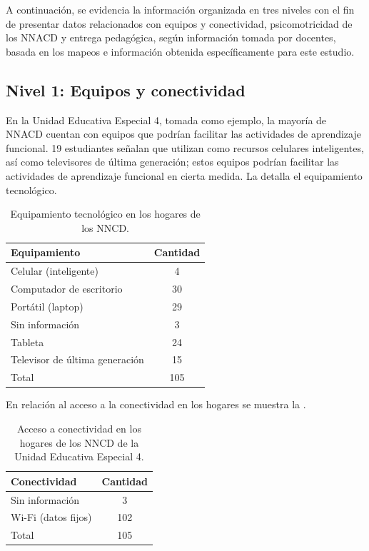 \documentclass[spanish]{textolivre}
\begin{document}
A continuación, se evidencia la información organizada en tres niveles con el fin de presentar datos relacionados con equipos y conectividad, psicomotricidad de los NNACD y entrega pedagógica, según información tomada por docentes, basada en los mapeos e información obtenida específicamente para este estudio.

\subsection{Nivel 1: Equipos y conectividad}\label{sec-fmt-manuscrito}
En la Unidad Educativa Especial 4, tomada como ejemplo, la mayoría de NNACD cuentan con equipos que podrían facilitar las actividades de aprendizaje funcional. 19 estudiantes señalan que utilizan como recursos celulares inteligentes, así como televisores de última generación; estos equipos podrían facilitar las actividades de aprendizaje funcional en cierta medida. La  detalla el equipamiento tecnológico.

\begin{table}[h!]
\centering
\begin{threeparttable}
\caption{Equipamiento tecnológico en los hogares de los NNCD.}
\label{tab02}
\centering
\begin{tabular}{l S}
\toprule
Equipamiento & {Cantidad} \\
\midrule
Celular (inteligente) & 4   \\
Computador de escritorio & 30  \\
Portátil (laptop) & 29 \\
Sin información & 3 \\
Tableta & 24 \\
Televisor de última generación & 15 \\
Total & 105 \\
\bottomrule
\end{tabular}
\end{threeparttable}
\end{table}

En relación al acceso a la conectividad en los hogares se muestra la .

\begin{table}[h!]
\centering
\begin{threeparttable}
\caption{Acceso a conectividad en los hogares de los NNCD de la Unidad Educativa Especial 4.}
\label{tab03}
\centering
\begin{tabular}{l S}
\toprule
Conectividad & {Cantidad} \\
\midrule
Sin información & 3 \\
Wi-Fi (datos fijos) & 102  \\
Total & 105 \\
\bottomrule
\end{tabular}
\end{threeparttable}
\end{table}
\end{document}

